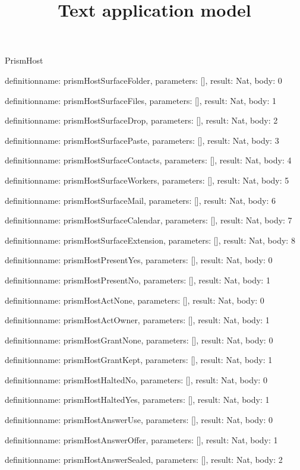 \begin{lexlean}{PrismHost}
\title{Text application model}
\begin{semanticmodule}
definition{name: prismHostSurfaceFolder, parameters: [], result: Nat, body: 0}

definition{name: prismHostSurfaceFiles, parameters: [], result: Nat, body: 1}

definition{name: prismHostSurfaceDrop, parameters: [], result: Nat, body: 2}

definition{name: prismHostSurfacePaste, parameters: [], result: Nat, body: 3}

definition{name: prismHostSurfaceContacts, parameters: [], result: Nat, body: 4}

definition{name: prismHostSurfaceWorkers, parameters: [], result: Nat, body: 5}

definition{name: prismHostSurfaceMail, parameters: [], result: Nat, body: 6}

definition{name: prismHostSurfaceCalendar, parameters: [], result: Nat, body: 7}

definition{name: prismHostSurfaceExtension, parameters: [], result: Nat, body: 8}

definition{name: prismHostPresentYes, parameters: [], result: Nat, body: 0}

definition{name: prismHostPresentNo, parameters: [], result: Nat, body: 1}

definition{name: prismHostActNone, parameters: [], result: Nat, body: 0}

definition{name: prismHostActOwner, parameters: [], result: Nat, body: 1}

definition{name: prismHostGrantNone, parameters: [], result: Nat, body: 0}

definition{name: prismHostGrantKept, parameters: [], result: Nat, body: 1}

definition{name: prismHostHaltedNo, parameters: [], result: Nat, body: 0}

definition{name: prismHostHaltedYes, parameters: [], result: Nat, body: 1}

definition{name: prismHostAnswerUse, parameters: [], result: Nat, body: 0}

definition{name: prismHostAnswerOffer, parameters: [], result: Nat, body: 1}

definition{name: prismHostAnswerSealed, parameters: [], result: Nat, body: 2}


\end{semanticmodule}
\end{lexlean}
